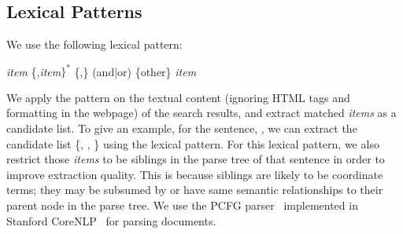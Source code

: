 \subsection{Lexical Patterns}
We use the following lexical pattern:
\begin{center}
\textit{item} \{,\textit{item}$\}^*$ \{,\} (and|or) \{other\} \textit{item} 
\end{center}
We apply the pattern on the textual content (ignoring HTML tags and formatting in the webpage) of the search results, and extract matched \textit{items} as a candidate list. To give an example, for the sentence, , we can extract the candidate list \{, , \} using the lexical pattern. For this lexical pattern, we also restrict those \textit{items} to be siblings in the parse tree of that sentence in order to improve extraction quality. This is because siblings are likely to be coordinate terms; they may be subsumed by or have same semantic relationships to their parent node in the parse tree. We use the PCFG parser~\cite{klein2003accurate} implemented in Stanford CoreNLP~\cite{manning2014stanford} for parsing documents.

